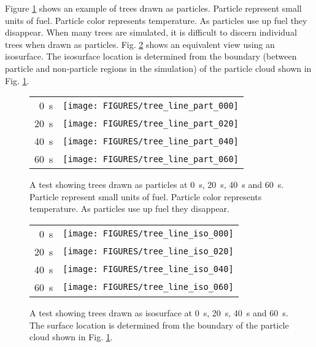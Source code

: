 Figure \ref{figWUIparts} shows an example of trees drawn as particles. Particle represent small units of fuel. Particle color represents temperature.  As particles use up fuel they disappear. When many trees are simulated, it is difficult to discern individual trees when drawn as particles.  Fig. \ref{figWUIiso} shows an equivalent view using an isosurface. The isosurface location is determined from the boundary (between particle and non-particle regions in the simulation) of the  particle cloud shown in
Fig. \ref{figWUIparts}.

\begin{figure}[\figoptions]
\begin{center}
\begin{tabular}{rc}
 \SI{0}{s}&\texttt{[image: FIGURES/tree\_line\_part\_000]}\\
 \SI{20}{s}&\texttt{[image: FIGURES/tree\_line\_part\_020]}\\
 \SI{40}{s}&\texttt{[image: FIGURES/tree\_line\_part\_040]}\\
 \SI{60}{s}&\texttt{[image: FIGURES/tree\_line\_part\_060]}
 \end{tabular}
\end{center}
 \caption[A test showing trees drawn as particles.]
 {A test showing trees drawn as particles at \SI{0}{s}, \SI{20}{s}, \SI{40}{s} and \SI{60}{s}.  Particle represent small units of fuel.  Particle color represents temperature.  As particles use up fuel they disappear.}
\label{figWUIparts}%
\end{figure}

\begin{figure}[\figoptions]
\begin{center}
\begin{tabular}{rc}
 \SI{0}{s}&\texttt{[image: FIGURES/tree\_line\_iso\_000]}\\
 \SI{20}{s}&\texttt{[image: FIGURES/tree\_line\_iso\_020]}\\
 \SI{40}{s}&\texttt{[image: FIGURES/tree\_line\_iso\_040]}\\
 \SI{60}{s}&\texttt{[image: FIGURES/tree\_line\_iso\_060]}
 \end{tabular}
\end{center}
 \caption[A test showing trees drawn as isosurfaces.]
 {A test showing trees drawn as isosurface  at \SI{0}{s}, \SI{20}{s}, \SI{40}{s} and \SI{60}{s}.  The surface location  is determined from the boundary of the  particle cloud shown in Fig. \ref{figWUIparts}.}
\label{figWUIiso}%
\end{figure}
\npage
